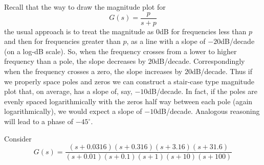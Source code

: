 Recall that the way to draw the magnitude plot for
\begin{equation*}
  G(s)= \frac{p}{s+p}
\end{equation*}
the usual approach is to treat the magnitude as $0$dB for frequencies less than $p$ and then for frequencies greater than $p$, as a line with a slope of $-20$dB/decade (on a log-dB scale). So, when the frequency crosses from a lower to higher frequency than a pole, the slope decreases by $20$dB/decade. Correspondingly when the frequency crosses a zero, the slope increases by $20$dB/decade. Thus if we properly space poles and zeros we can construct a stair-case type magnitude plot that, on average, has a slope of, say, $-10$dB/decade. In fact, if the poles are evenly spaced logarithmically with the zeros half way between each pole (again logarithmically), we would expect a slope of $-10$dB/decade. Analogous reasoning will lead to a phase of $-45^\circ$.

\begin{example}
  Consider 
  \begin{equation*}
    G(s) = \frac{ \left(s + 0.0316 \right) \left(s + 0.316 \right)  \left(s + 3.16 \right) \left(s + 31.6 \right)  
    }{\left(s+0.01 \right)\left(s+0.1 \right) \left(s+1 \right) \left(s+10 \right) \left(s+100 \right)} 
  \end{equation*}
\end{example}
